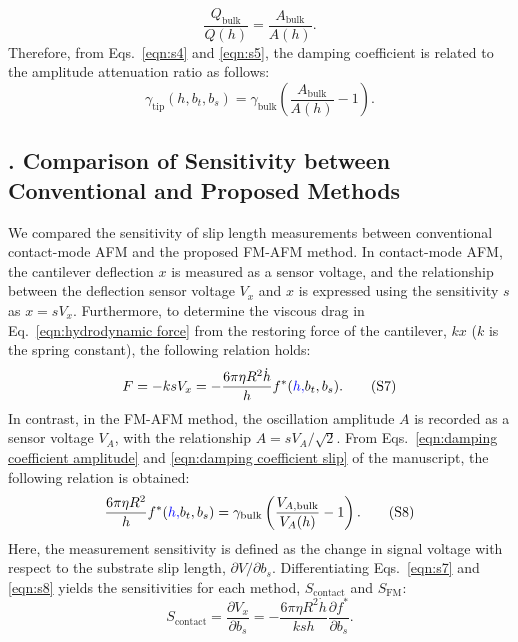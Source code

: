 \documentclass[journal=jacsat,manuscript=article]{achemso}
\newcounter{supppart}
\renewcommand{\thesupppart}{\Roman{supppart}}
\newcommand{\subsectionpart}[2]{%
  \refstepcounter{supppart}%
  \subsection{\thesupppart. #2}%
  \label{supppart:#1}%
}
\providecommand{\DIFadd}[1]{{\protect\color{blue}#1}} %
\providecommand{\DIFaddbegin}{} %
\providecommand{\DIFaddend}{} %
\newcommand{\DIFaddincludegraphics}[2][]{{\color{blue}\DIFOincludegraphics[#1]{#2}}} %
\DeclareRobustCommand{\DIFaddbegin}{\DIFOaddbegin \let\includegraphics\DIFaddincludegraphics} %
\DeclareRobustCommand{\DIFaddend}{\DIFOaddend \let\includegraphics\DIFOincludegraphics} %
\begin{document}
\begin{equation}
  \frac{Q_{\text{bulk}}}{Q(h)} = \frac{A_{\text{bulk}}}{A(h)}.
  \tag{S5}
  \label{eqn:s5}
\end{equation}
Therefore, from Eqs.~\ref{eqn:s4} and \ref{eqn:s5}, the damping coefficient is related to the amplitude attenuation ratio as follows:
\begin{equation}
  \gamma_{\text{tip}}(h, b_t, b_s) = \gamma_{\text{bulk}}\left(\frac{A_{\text{bulk}}}{A(h)} - 1\right).
  \tag{S6}
  \label{eqn:s6}
\end{equation}
\subsectionpart{sensitivity-comparison}{Comparison of Sensitivity between Conventional and Proposed Methods}

We compared the sensitivity of slip length measurements between conventional contact-mode AFM and the proposed FM-AFM method. In contact-mode AFM, the cantilever deflection \(x\) is measured as a sensor voltage, and the relationship between the deflection sensor voltage \(V_x\) and \(x\) is expressed using the sensitivity \(s\) as \(x = sV_x\). Furthermore, to determine the viscous drag in Eq.~\ref{eqn:hydrodynamic force} from the restoring force of the cantilever, \(kx\) (\(k\) is the spring constant), the following relation holds:
\begin{equation}
  F = -ksV_x = -\frac{6\pi\eta R^2 \dot{h}}{h} f^{*}(\DIFaddbegin \DIFadd{h, }\DIFaddend b_t, b_s).
  \tag{S7}
  \label{eqn:s7}
\end{equation}
In contrast, in the FM-AFM method, the oscillation amplitude \(A\) is recorded as a sensor voltage \(V_A\), with the relationship \(A = sV_A/\sqrt{2}\). From Eqs.~\ref{eqn:damping coefficient amplitude} and \ref{eqn:damping coefficient slip} of the manuscript, the following relation is obtained:
\begin{equation}
  \frac{6\pi\eta R^2}{h} f^{*}(\DIFaddbegin \DIFadd{h, }\DIFaddend b_t, b_s) = \gamma_{\text{bulk}}\left(\frac{V_{A,\text{bulk}}}{V_A(h)} - 1\right).
  \tag{S8}
  \label{eqn:s8}
\end{equation}
Here, the measurement sensitivity is defined as the change in signal voltage with respect to the substrate slip length, \(\partial V/\partial b_s\). Differentiating Eqs.~\ref{eqn:s7} and \ref{eqn:s8} yields the sensitivities for each method, \(S_{\text{contact}}\) and \(S_{\text{FM}}\):
\begin{equation}
  S_{\text{contact}} = \frac{\partial V_x}{\partial b_s} = -\frac{6\pi\eta R^2 \dot{h}}{k s h}\frac{\partial f^{*}}{\partial b_s}.
  \tag{S9}
  \label{eqn:s9}
\end{equation}
\end{document}
